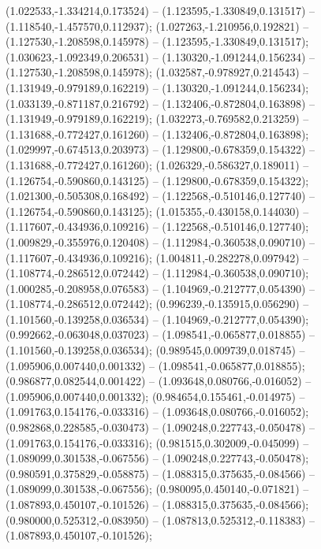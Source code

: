  (1.022533,-1.334214,0.173524) -- (1.123595,-1.330849,0.131517) -- (1.118540,-1.457570,0.112937);
 (1.027263,-1.210956,0.192821) -- (1.127530,-1.208598,0.145978) -- (1.123595,-1.330849,0.131517);
 (1.030623,-1.092349,0.206531) -- (1.130320,-1.091244,0.156234) -- (1.127530,-1.208598,0.145978);
 (1.032587,-0.978927,0.214543) -- (1.131949,-0.979189,0.162219) -- (1.130320,-1.091244,0.156234);
 (1.033139,-0.871187,0.216792) -- (1.132406,-0.872804,0.163898) -- (1.131949,-0.979189,0.162219);
 (1.032273,-0.769582,0.213259) -- (1.131688,-0.772427,0.161260) -- (1.132406,-0.872804,0.163898);
 (1.029997,-0.674513,0.203973) -- (1.129800,-0.678359,0.154322) -- (1.131688,-0.772427,0.161260);
 (1.026329,-0.586327,0.189011) -- (1.126754,-0.590860,0.143125) -- (1.129800,-0.678359,0.154322);
 (1.021300,-0.505308,0.168492) -- (1.122568,-0.510146,0.127740) -- (1.126754,-0.590860,0.143125);
 (1.015355,-0.430158,0.144030) -- (1.117607,-0.434936,0.109216) -- (1.122568,-0.510146,0.127740);
 (1.009829,-0.355976,0.120408) -- (1.112984,-0.360538,0.090710) -- (1.117607,-0.434936,0.109216);
 (1.004811,-0.282278,0.097942) -- (1.108774,-0.286512,0.072442) -- (1.112984,-0.360538,0.090710);
 (1.000285,-0.208958,0.076583) -- (1.104969,-0.212777,0.054390) -- (1.108774,-0.286512,0.072442);
 (0.996239,-0.135915,0.056290) -- (1.101560,-0.139258,0.036534) -- (1.104969,-0.212777,0.054390);
 (0.992662,-0.063048,0.037023) -- (1.098541,-0.065877,0.018855) -- (1.101560,-0.139258,0.036534);
 (0.989545,0.009739,0.018745) -- (1.095906,0.007440,0.001332) -- (1.098541,-0.065877,0.018855);
 (0.986877,0.082544,0.001422) -- (1.093648,0.080766,-0.016052) -- (1.095906,0.007440,0.001332);
 (0.984654,0.155461,-0.014975) -- (1.091763,0.154176,-0.033316) -- (1.093648,0.080766,-0.016052);
 (0.982868,0.228585,-0.030473) -- (1.090248,0.227743,-0.050478) -- (1.091763,0.154176,-0.033316);
 (0.981515,0.302009,-0.045099) -- (1.089099,0.301538,-0.067556) -- (1.090248,0.227743,-0.050478);
 (0.980591,0.375829,-0.058875) -- (1.088315,0.375635,-0.084566) -- (1.089099,0.301538,-0.067556);
 (0.980095,0.450140,-0.071821) -- (1.087893,0.450107,-0.101526) -- (1.088315,0.375635,-0.084566);
 (0.980000,0.525312,-0.083950) -- (1.087813,0.525312,-0.118383) -- (1.087893,0.450107,-0.101526);
